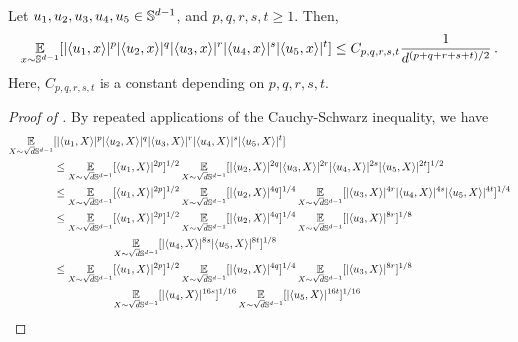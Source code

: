 \begin{lemma} \label{lemma:sphere_moment}
Let $u_1, u_2, u_3, u_4, u_5 \in \mathbb{S}^{d - 1}$, and $p, q, r, s, t \geq 1$. Then,
\begin{align}
\operatorname*{\mathbb{E}}_{x \sim \mathbb{S}^{d - 1}} [|\langle u_1, x \rangle|^p |\langle u_2, x \rangle|^q |\langle u_3, x \rangle|^r |\langle u_4, x \rangle|^s |\langle u_5, x \rangle|^t] \leq C_{p, q, r, s, t} \frac{1}{d^{(p + q + r + s + t)/2}} \,.
\end{align}
Here, $C_{p, q, r, s, t}$ is a constant depending on $p, q, r, s, t$.
\end{lemma}
\begin{proof}[Proof of ]
By repeated applications of the Cauchy-Schwarz inequality, we have
\begin{align}
\E_{\srvL \sim \sqrt{d}\bbS^{d - 1}} & [|\langle \u_1, \srvL \rangle|^p |\langle \u_2, \srvL \rangle|^q |\langle \u_3, \srvL \rangle|^r |\langle \u_4, \srvL \rangle|^s |\langle \u_5, \srvL \rangle|^t] \\
& \leq \E_{\srvL \sim \sqrt{d} \bbS^{d - 1}} [\langle \u_1, \srvL \rangle|^{2p}]^{1/2} \E_{\srvL \sim \sqrt{d} \bbS^{d - 1}} [|\langle \u_2, \srvL \rangle|^{2q} |\langle \u_3, \srvL \rangle|^{2r} |\langle \u_4, \srvL \rangle|^{2s} |\langle \u_5, \srvL \rangle|^{2t}]^{1/2} \\
& \leq \E_{\srvL \sim \sqrt{d} \bbS^{d - 1}} [\langle \u_1, \srvL \rangle|^{2p}]^{1/2} \E_{\srvL \sim \sqrt{d} \bbS^{d - 1}} [|\langle \u_2, \srvL \rangle|^{4q}]^{1/4} \E_{\srvL \sim \sqrt{d} \bbS^{d - 1}}[|\langle \u_3, \srvL \rangle|^{4r} |\langle \u_4, \srvL \rangle|^{4s} |\langle \u_5, \srvL \rangle|^{4t}]^{1/4} \\
& \leq \E_{\srvL \sim \sqrt{d} \bbS^{d - 1}} [\langle \u_1, \srvL \rangle|^{2p}]^{1/2} \E_{\srvL \sim \sqrt{d} \bbS^{d - 1}} [|\langle \u_2, \srvL \rangle|^{4q}]^{1/4} \E_{\srvL \sim \sqrt{d} \bbS^{d - 1}}[|\langle \u_3, \srvL \rangle|^{8r}]^{1/8} \\
& \nextlinespace\nextlinespace \E_{\srvL \sim \sqrt{d} \bbS^{d - 1}} [|\langle \u_4, \srvL \rangle|^{8s} |\langle \u_5, \srvL \rangle|^{8t}]^{1/8} \\
& \leq \E_{\srvL \sim \sqrt{d} \bbS^{d - 1}} [\langle \u_1, \srvL \rangle|^{2p}]^{1/2} \E_{\srvL \sim \sqrt{d} \bbS^{d - 1}} [|\langle \u_2, \srvL \rangle|^{4q}]^{1/4} \E_{\srvL \sim \sqrt{d} \bbS^{d - 1}}[|\langle \u_3, \srvL \rangle|^{8r}]^{1/8} \\
& \nextlinespace\nextlinespace \E_{\srvL \sim \sqrt{d} \bbS^{d - 1}} [|\langle \u_4, \srvL \rangle|^{16s}]^{1/16} \E_{\srvL \sim \sqrt{d} \bbS^{d - 1}}[|\langle \u_5, \srvL \rangle|^{16t}]^{1/16}

\end{align}
\end{proof}
